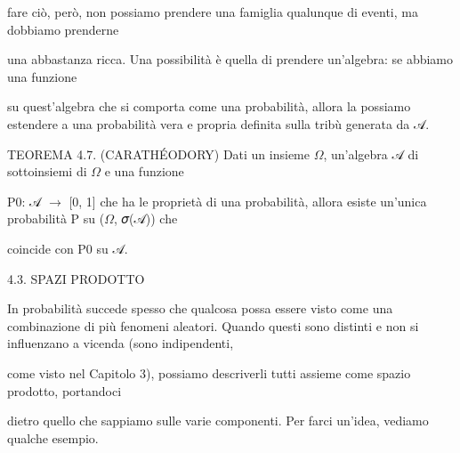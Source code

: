 \documentclass[a4paper,portrait,12pt]{article}
\begin{document}
\begin{flushleft}
fare ci\`{o}, per\`{o}, non possiamo prendere una famiglia qualunque di eventi, ma dobbiamo prenderne
\end{flushleft}


\begin{flushleft}
una abbastanza ricca. Una possibilit\`{a} \`{e} quella di prendere un'algebra: se abbiamo una funzione
\end{flushleft}


\begin{flushleft}
su quest'algebra che si comporta come una probabilit\`{a}, allora la possiamo estendere a una probabilit\`{a} vera e propria definita sulla tribù generata da 𝒜.
\end{flushleft}


\begin{flushleft}
TEOREMA 4.7. (CARATH\'{E}ODORY) Dati un insieme $\Omega$, un'algebra 𝒜 di sottoinsiemi di $\Omega$ e una funzione
\end{flushleft}


\begin{flushleft}
P0: 𝒜 $\rightarrow$ [0, 1] che ha le propriet\`{a} di una probabilit\`{a}, allora esiste un'unica probabilit\`{a} P su ($\Omega$, 𝜎(𝒜)) che
\end{flushleft}


\begin{flushleft}
coincide con P0 su 𝒜.
\end{flushleft}





\begin{flushleft}
4.3. SPAZI PRODOTTO
\end{flushleft}


\begin{flushleft}
In probabilit\`{a} succede spesso che qualcosa possa essere visto come una combinazione di più fenomeni aleatori. Quando questi sono distinti e non si influenzano a vicenda (sono indipendenti,
\end{flushleft}


\begin{flushleft}
come visto nel Capitolo 3), possiamo descriverli tutti assieme come spazio prodotto, portandoci
\end{flushleft}


\begin{flushleft}
dietro quello che sappiamo sulle varie componenti. Per farci un'idea, vediamo qualche esempio.
\end{flushleft}
\end{document}
